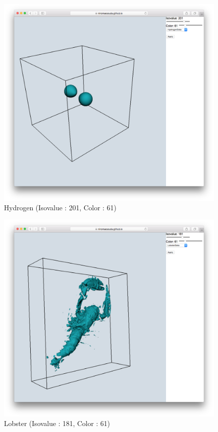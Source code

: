 \documentclass[a4paper]{jsarticle}
\begin{document}
\begin{figure}[htbp]
\begin{minipage}{0.5\hsize}
\begin{center}
\includegraphics[scale = 0.18]{vis_hyd2.png}
\\ Hydrogen (Isovalue : 201, Color : 61)
\end{center}
\end{minipage}
\begin{minipage}{0.5\hsize}
\begin{center}
\includegraphics[scale = 0.18]{vis_lob2.png}
\\ Lobster (Isovalue : 181, Color : 61)
\end{center}
\end{minipage}
\end{figure}
\end{document}

